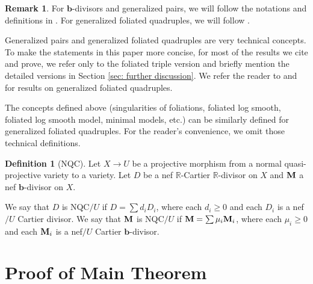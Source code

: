\documentclass[11pt]{amsart}
\numberwithin{equation}{section}
\newcommand{\bb}{\bm{b}}
\newcommand{\Mm}{{\bf{M}}}
\newcommand{\Rr}{\mathbb{R}}
\theoremstyle{definition}
\newtheorem{defn}[thm]{Definition}
\theoremstyle{definition}
\newtheorem{rem}[thm]{Remark}
\theoremstyle{definition}
\begin{document}
\begin{rem}
For $\bb$-divisors and generalized pairs, we will follow the notations and definitions in \cite{BZ16, HL23}. For generalized foliated quadruples, we will follow \cite{CHLX23}.

Generalized pairs and generalized foliated quadruples are very technical concepts. To make the statements in this paper more concise, for most of the results we cite and prove, we refer only to the foliated triple version and briefly mention the detailed versions in Section \ref{sec: further discussion}. We refer the reader to \cite[Appendix A]{LMX24b} and \cite{CHLX23} for results on generalized foliated quadruples.

The concepts defined above (singularities of foliations, foliated log smooth, foliated log smooth model, minimal models, etc.) can be similarly defined for generalized foliated quadruples. For the reader's convenience, we omit those technical definitions.
\end{rem}

\begin{defn}[NQC]
    Let $X\rightarrow U$ be a projective morphism from a normal quasi-projective variety to a variety. Let $D$ be a nef $\Rr$-Cartier $\Rr$-divisor on $X$ and $\Mm$ a nef $\bb$-divisor on $X$.

    We say that $D$ is NQC$/U$ if $D=\sum d_iD_i$, where each $d_i\geq 0$ and each $D_i$ is a nef$/U$ Cartier divisor. We say that $\Mm$ is NQC$/U$ if $\Mm=\sum \mu_i\Mm_i$, where each $\mu_i\geq 0$ and each $\Mm_i$ is a nef$/U$ Cartier $\bb$-divisor.
\end{defn}



\section{Proof of Main Theorem}\label{sec: proof}
\end{document}
